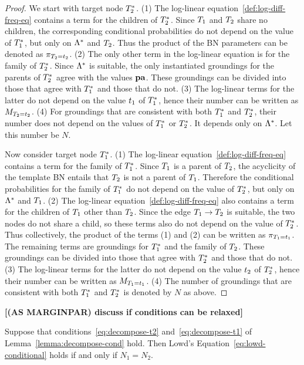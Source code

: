 \documentclass[runningheads,a4paper]{llncs}
\renewcommand{\marginpar}[1]{\fixneeded{(AS MARGINPAR) #1}}
\newcommand{\fixneeded}[1]{\textbf{[\footnotesize #1]}}
\begin{document}
\begin{proof}
We start with target node $T_{2}^{*}\hspace{0.0ex}$. (1) The log-linear equation~\ref{def:log-diff-freq-eq} contains a term for the children of $T_{2}^{*}\hspace{0.0ex}$. Since $T_{1}$ and $T_{2}$ share no children, the corresponding conditional probabilities do not depend on the value of $T_{1}^{*}\hspace{0.0ex}$, but only on $\Lambda^{*}\hspace{0.0ex}$ and $T_{2}$. Thus the product of the BN parameters can be denoted as $\pi_{T_2=t_{2}}$. (2) The only other term in the log-linear equation is for the family of $T_{2}^{*}\hspace{0.0ex}$. Since $\Lambda^{*}\hspace{0.0ex}$ is suitable, the only instantiated groundings for the parents of $T_{2}^{*}\hspace{0.0ex}$ agree with the values $\mathbf{pa}$. These groundings can be divided into those that agree with $T_{1}^{*}\hspace{0.0ex}$ and those that do not. (3) The log-linear terms for the latter do not depend on the value $t_{1}$ of $T_{1}^{*}\hspace{0.0ex}$,  hence their number can be written as $M_{T_2=t_{2}}$. (4) For groundings that are consistent with both  $T_{1}^{*}\hspace{0.0ex}$ and $T_{2}^{*}\hspace{0.0ex}$, their number does not depend on the values of $T_{1}^{*}\hspace{0.0ex}$ or $T_{2}^{*}\hspace{0.0ex}$. It depends only on $\Lambda^{*}\hspace{0.0ex}$. Let this number be $N$. 

Now consider target node $T_{1}^{*}\hspace{0.0ex}$. (1) The log-linear equation~\ref{def:log-diff-freq-eq} contains a term for the family of $T_{1}^{*}\hspace{0.0ex}$. Since $T_{1}$ is a parent of $T_{2}$, the acyclicity of the template BN entails that $T_{2}$ is not a parent of $T_{1}$. Therefore  the conditional probabilities for the family of $T_{1}^{*}\hspace{0.0ex}$ do not depend on the value of $T_{2}^{*}\hspace{0.0ex}$, but only on $\Lambda^{*}\hspace{0.0ex}$ and $T_{1}$. (2) The log-linear equation~\ref{def:log-diff-freq-eq} also contains a term for the children of $T_{1}$ other than $T_{2}$. Since the edge $T_{1} \rightarrow T_{2}$ is suitable, the two nodes do not share a child, so these terms also do not depend on the value of $T_{2}^{*}\hspace{0.0ex}$. Thus collectively, the product of the terms (1) and (2) can be written as $\pi_{T_1=t_{1}} $. The remaining terms are groundings for $T_{1}^{*}\hspace{0.0ex}$ and the family of $T_{2}$. These groundings can be divided into those that agree with $T_{2}^{*}\hspace{0.0ex}$ and those that do not. (3) The log-linear terms for the latter do not depend on the value $t_{2}$ of $T_{2}^{*}\hspace{0.0ex}$,  hence their number can be written as $M_{T_1=t_{1}}$. (4) The number of groundings that are consistent with both  $T_{1}^{*}\hspace{0.0ex}$ and $T_{2}^{*}\hspace{0.0ex}$ is denoted by $N$ as above.
\end{proof}

\marginpar{discuss if conditions can be relaxed}
\begin{lemma}
Suppose that conditions~\eqref{eq:decompose-t2} and~\eqref{eq:decompose-t1} of Lemma~\ref{lemma:decompose-cond} hold. Then Lowd's Equation~\eqref{eq:lowd-conditional} holds if and only if $N_{1} = N_{2}$. 
\end{lemma}
\end{document}
